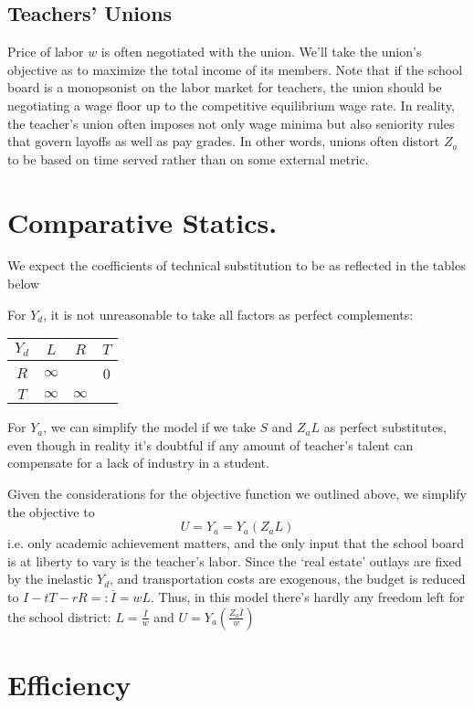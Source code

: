 \documentclass{homework}
\begin{document}
\subsection{Teachers' Unions} Price of labor $w$ is often negotiated with the union. We'll take the union's objective as to maximize the total income of its members. Note that if the school board is a monopsonist on the labor market for teachers, the union should be negotiating a wage floor up to the competitive equilibrium wage rate. In reality, the teacher's union often imposes not only wage minima but also seniority rules that govern layoffs as well as pay grades. In other words, unions often distort $Z_a$ to be based on time served rather than on some external metric. 

\section{Comparative Statics.} We expect the coefficients of technical substitution to be as reflected in the tables below


For $Y_d$, it is not unreasonable to take all factors as perfect complements:
\begin{center}
\begin{tabular}{c | c c c } 
\textbf{$Y_d$}  & $L$ & $R$ & $T$ \\
\hline
$R$ & $\infty$ & & 0 \\
$T$ & $\infty$ & $\infty$ &
\end{tabular}
\end{center}

For $Y_a$, we can simplify the model if we take $S$ and $Z_a L$ as perfect substitutes, even though in reality it's doubtful if any amount of teacher's talent can compensate for a lack of industry in a student. 

Given the considerations for the objective function we outlined above, we simplify the objective to
\[U = Y_a = Y_a(Z_a L)\]
i.e. only academic achievement matters, and the only input that the school board is at liberty to vary is the teacher's labor. Since the `real estate' outlays are fixed by the inelastic $Y_d$, and transportation costs are exogenous, the budget is reduced to $I - tT - rR =: \bar{I} = w L$.
Thus, in this model there's hardly any freedom left for the school district: $L = \frac{\bar{I}}{w}$ and $U = Y_a (\frac{Z_a \bar{I}}{w})$

\section{Efficiency}
\end{document}
